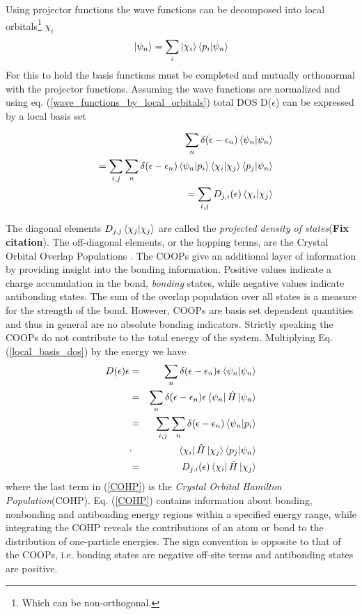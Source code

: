 \documentclass[%
 reprint,
nofootinbib,
 amsmath,amssymb,
 aps,
]{revtex4-2}
\begin{document}
Using projector functions the wave functions can be decomposed into local orbitals\footnote{Which can be non-orthogonal.} $\chi_i$ \cite{Bloechl1994}
\begin{eqnarray}
\ket{\psi_n}=\sum_i\ket{\chi_i}\bra{p_i}\ket{\psi_n} \label{wave_functions_by_local_orbitals}
\end{eqnarray}
For this to hold the basis functions must be completed and mutually orthonormal with the projector functions.
Assuming the wave functions are normalized and using eq. (\ref{wave_functions_by_local_orbitals}) total DOS D($\epsilon$) can be expressed by a local basis set

\begin{eqnarray}
&&\sum_n\delta(\epsilon-\epsilon_n)\bra{\psi_n}\ket{\psi_n}\nonumber\\
&&=\sum_{i,j}\sum_n\delta(\epsilon-\epsilon_n)\bra{\psi_n}\ket{p_i}\bra{\chi_i}\ket{\chi_j}\bra{p_j}\ket{\psi_n}\nonumber\\
&&=\sum_{i,j}D_{j,i}(\epsilon)\bra{\chi_i}\ket{\chi_j} \label{local_basis_dos}
\end{eqnarray}

The diagonal elements $D_{j,j}\bra{\chi_j}\ket{\chi_j}$ are called the \textit{projected density of states}\cite{HANDSON}(\textbf{Fix citation}). The off-diagonal elements, or the hopping terms, are the Crystal Orbital Overlap Populations \cite{HughbanksAndHoffmann}. 
The COOPs give an additional layer of information by providing insight into the bonding information. Positive values indicate a charge accumulation in the bond, \textit{bonding} states, while negative values indicate antibonding states. The sum of the overlap population over all states is a measure for the strength of the bond. 
However, COOPs are basis set dependent quantities and thus in general are no absolute bonding indicators.
\hfill\break Strictly speaking the COOPs do not contribute to the total energy of the system. 
Multiplying Eq. (\ref{local_basis_dos}) by the energy we have
\begin{eqnarray}
D(\epsilon)\epsilon &=&\sum_n\delta(\epsilon-\epsilon_n)\epsilon\bra{\psi_n}\ket{\psi_n} \nonumber\\
&=&\sum_n\delta(\epsilon-\epsilon_n)\epsilon\bra{\psi_n}\hat{H}\ket{\psi_n} \nonumber\\
&=&\sum_{i,j}\sum_n\delta(\epsilon-\epsilon_n)\bra{\psi_n}\ket{p_i}\nonumber\\
&\cdot&\bra{\chi_i}\hat{H}\ket{\chi_j}\bra{p_j}\ket{\psi_n} \nonumber\\
&=&D_{j,i}(\epsilon)\bra{\chi_i}\hat{H}\ket{\chi_j} \label{COHP}
\end{eqnarray}
where the last term in (\ref{COHP}) is the \textit{Crystal Orbital Hamilton Population}(COHP)\cite{dronskowski1993crystal}. Eq. (\ref{COHP}) contains information about bonding, nonbonding and antibonding energy regions within a specified energy range, while integrating the COHP reveals the contributions of an atom or bond to the distribution of one-particle energies\cite{dronskowski1993crystal}. The sign convention is opposite to that of the COOPs, i.e. bonding states are negative off-site terms and antibonding states are positive. 
\end{document}

